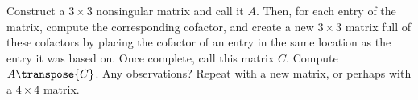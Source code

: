 Construct a $3\times 3$ nonsingular matrix and call it $A$.  Then, for each entry of the matrix, compute the corresponding cofactor, and create a new $3\times 3$ matrix full of these cofactors by placing the cofactor of an entry in the same location as the entry it was based on.  Once complete, call this matrix $C$.  Compute $A\transpose{C}$.  Any observations?  Repeat with a new matrix, or perhaps with a $4\times 4$ matrix.